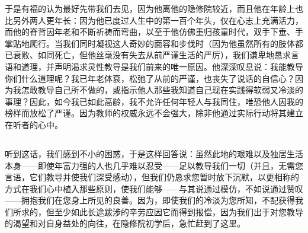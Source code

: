 \par

于是有福的认为最好先带我们去见，因为他离他的隐修院较近，而且他在年龄上也比另外两人更年长：因为他已度过人生中的第一百个年头，仅在心志上充满活力，而他的脊背因年老和不断祈祷而弯曲，以至于他仿佛重归孩童时代，双手下垂、手掌贴地爬行。当我们同时凝视这人奇妙的面容和步伐时（因为他虽然所有的肢体都已衰败、如同死亡，但他丝毫没有失去从前严谨生活的严厉），我们谦卑地恳求言语和道理，并声明渴求灵性教导是我们前来的唯一原因。他深深叹息说：我能教导你们什么道理呢？我已年老体衰，松弛了从前的严谨，也丧失了说话的自信心？因为我怎敢教导自己所不做的，或指示他人那些我知道自己现在实践得软弱又冷淡的事理？因此，如今我已如此高龄，我不允许任何年轻人与我同住，唯恐他人因我的榜样而放松了严谨。因为教师的权威永远不会强大，除非他通过实际行动将其建立在听者的心中。\par


\subsection{}

\par

听到这话，我们感到不小的困惑，于是这样回答说：虽然此地的艰难以及独居生活本身——即使年富力强的人也几乎难以忍受——足以教导我们一切（并且，无需您言语，它们教导并使我们深受感动），但我们仍恳求您暂时放下沉默，以更相称的方式在我们心中植入那些原则，使我们能够——与其说通过模仿，不如说通过赞叹——拥抱我们在您身上所见的良善。因为，即使我们的冷淡为您所知，不配获得我们所求的，但至少如此长途跋涉的辛劳应因它而得到报偿，因为我们出于对您教导的渴望和对自身益处的向往，在隐修院初学后，急忙赶到了这里。\par


\subsection{}

\par

